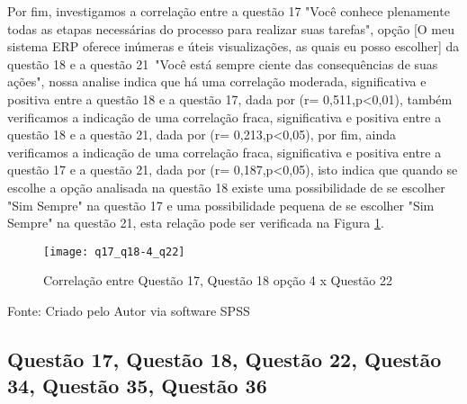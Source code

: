 Por fim, investigamos a correlação entre a questão 17 "Você conhece plenamente todas as etapas necessárias do processo para realizar suas tarefas", opção [O meu sistema ERP oferece inúmeras e úteis visualizações, as quais eu posso escolher] da questão 18 e a questão 21 "Você está sempre ciente das consequências de suas ações", nossa analise indica que há uma correlação moderada, significativa e positiva entre a questão 18 e a questão 17, dada por (r= 0,511,p<0,01), também verificamos a indicação de uma correlação fraca, significativa e positiva entre a questão 18 e a questão 21, dada por (r= 0,213,p<0,05), por fim, ainda verificamos a indicação de uma correlação fraca, significativa e positiva entre a questão 17 e a questão 21, dada por (r= 0,187,p<0,05), isto indica que quando se escolhe a opção analisada na questão 18 existe uma possibilidade de se escolher "Sim Sempre" na questão 17 e uma possibilidade pequena de se escolher "Sim Sempre" na questão 21, esta relação pode ser verificada na Figura \ref{fig:figura-q17_q18-4_q22}.\newline

\begin{figure}[H]
	\centering	
	\caption{Correlação entre Questão 17, Questão 18 opção 4 x Questão 22}
	\texttt{[image: q17\_q18-4\_q22]}
	\label{fig:figura-q17_q18-4_q22}
\end{figure}
\vspace{-0.8 cm} \hspace{0.45 cm} Fonte: Criado pelo Autor via software SPSS\newline

\subsection{Questão 17, Questão 18, Questão 22, Questão 34, Questão 35, Questão 36}

